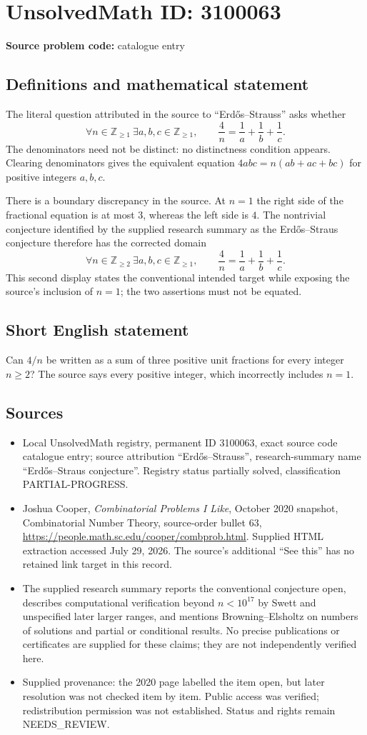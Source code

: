 \documentclass[11pt]{article}
\newcommand{\Z}{\mathbb{Z}}
\begin{document}
\section*{UnsolvedMath ID: 3100063}
\textbf{Source problem code:} catalogue entry
\subsection{Definitions and mathematical statement}
The literal question attributed in the source to ``Erd\H{o}s--Strauss'' asks whether
\[
\forall n\in\Z_{\geq1}\ \exists a,b,c\in\Z_{\geq1},\qquad
\frac4n=\frac1a+\frac1b+\frac1c.
\]
The denominators need not be distinct: no distinctness condition appears. Clearing denominators gives the equivalent equation $4abc=n(ab+ac+bc)$ for positive integers $a,b,c$.

There is a boundary discrepancy in the source. At $n=1$ the right side of the fractional equation is at most $3$, whereas the left side is $4$. The nontrivial conjecture identified by the supplied research summary as the Erd\H{o}s--Straus conjecture therefore has the corrected domain
\[
\forall n\in\Z_{\geq2}\ \exists a,b,c\in\Z_{\geq1},\qquad
\frac4n=\frac1a+\frac1b+\frac1c.
\]
This second display states the conventional intended target while exposing the source's inclusion of $n=1$; the two assertions must not be equated.
\subsection{Short English statement}
Can $4/n$ be written as a sum of three positive unit fractions for every integer $n\geq2$? The source says every positive integer, which incorrectly includes $n=1$.
\subsection{Sources}
\begin{itemize}
\item Local UnsolvedMath registry, permanent ID 3100063, exact source code catalogue entry; source attribution ``Erd\H{o}s--Strauss'', research-summary name ``Erd\H{o}s--Straus conjecture''. Registry status partially solved, classification PARTIAL-PROGRESS.
\item Joshua Cooper, \emph{Combinatorial Problems I Like}, October 2020 snapshot, Combinatorial Number Theory, source-order bullet 63, \url{https://people.math.sc.edu/cooper/combprob.html}. Supplied HTML extraction accessed July 29, 2026. The source's additional ``See this'' has no retained link target in this record.
\item The supplied research summary reports the conventional conjecture open, describes computational verification beyond $n<10^{17}$ by Swett and unspecified later larger ranges, and mentions Browning--Elsholtz on numbers of solutions and partial or conditional results. No precise publications or certificates are supplied for these claims; they are not independently verified here.
\item Supplied provenance: the 2020 page labelled the item open, but later resolution was not checked item by item. Public access was verified; redistribution permission was not established. Status and rights remain NEEDS\_REVIEW.
\end{itemize}
\end{document}
